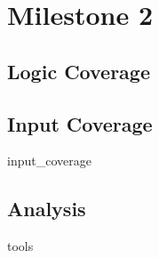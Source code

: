 \section{Milestone 2}

\subsection{Logic Coverage}

\subsection{Input Coverage}
\label{sec:input-coverage}
{input_coverage}

\subsection{Analysis}

{tools}
